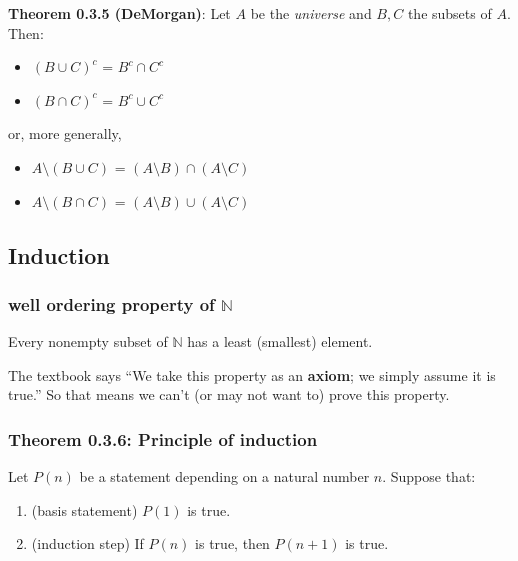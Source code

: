 \documentclass[12pt, letterpaper, oneside]{book}
\begin{document}
\textbf{Theorem 0.3.5 (DeMorgan)}: Let $A$ be the \textit{universe} and $B, C$
the subsets of $A$. Then:

\begin{itemize}
  \item $(B \cup C)^c$ = $B^c \cap C^c$
  \item $(B \cap C)^c$ = $B^c \cup C^c$
\end{itemize}

or, more generally,

\begin{itemize}
  \item $A \setminus (B \cup C)$ = $(A \setminus B) \cap (A \setminus C)$
  \item $A \setminus (B \cap C)$ = $(A \setminus B) \cup (A \setminus C)$
\end{itemize}

\subsection{Induction}

\subsubsection{well ordering property of $\mathbb{N}$}

Every nonempty subset of $\mathbb{N}$ has a least (smallest) element.

The textbook says ``We take this property as an \textbf{axiom}; we simply
assume it is true.'' So that means we can't (or may not want to) prove this
property.

\subsubsection{Theorem 0.3.6: Principle of induction}

Let $P(n)$ be a statement depending on a natural number $n$. Suppose that:

\begin{enumerate}
  \item (basis statement) $P(1)$ is true.
  \item (induction step) If $P(n)$ is true, then $P(n+1)$ is true.
\end{enumerate}
\end{document}
